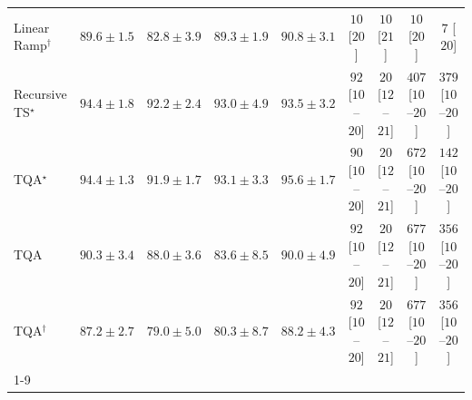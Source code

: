 \begin{tabular}{l|cccc|cccc|}
Linear Ramp$^\dagger$ & {\cellcolor[HTML]{04649D}} \color[HTML]{F1F1F1} $89.6\pm 1.5$ & {\cellcolor[HTML]{2484BA}} \color[HTML]{F1F1F1} $82.8\pm 3.9$ & {\cellcolor[HTML]{05659F}} \color[HTML]{F1F1F1} $89.3\pm 1.9$ & {\cellcolor[HTML]{045F95}} \color[HTML]{F1F1F1} $90.8\pm 3.1$ & {\cellcolor[HTML]{FFF7F3}} \color[HTML]{000000} $10$ [$20$] & {\cellcolor[HTML]{FFF7F3}} \color[HTML]{000000} $10$ [$21$] & {\cellcolor[HTML]{FFF7F3}} \color[HTML]{000000} $10$ [$20$] & {\cellcolor[HTML]{FFF7F3}} \color[HTML]{000000} $7$ [$20$] \\
Recursive TS$^\star$ & {\cellcolor[HTML]{034C78}} \color[HTML]{F1F1F1} $94.4\pm 1.8$ & {\cellcolor[HTML]{045A8D}} \color[HTML]{F1F1F1} $92.2\pm 2.4$ & {\cellcolor[HTML]{045585}} \color[HTML]{F1F1F1} $93.0\pm 4.9$ & {\cellcolor[HTML]{045280}} \color[HTML]{F1F1F1} $93.5\pm 3.2$ & {\cellcolor[HTML]{FDE3E0}} \color[HTML]{000000} $92$ [$10$--$20$] & {\cellcolor[HTML]{FFF4F0}} \color[HTML]{000000} $20$ [$12$--$21$] & {\cellcolor[HTML]{F361A0}} \color[HTML]{F1F1F1} $407$ [$10$--$20$] & {\cellcolor[HTML]{F770A4}} \color[HTML]{F1F1F1} $379$ [$10$--$20$] \\
TQA$^\star$ & {\cellcolor[HTML]{034C78}} \color[HTML]{F1F1F1} $94.4\pm 1.3$ & {\cellcolor[HTML]{045B8E}} \color[HTML]{F1F1F1} $91.9\pm 1.7$ & {\cellcolor[HTML]{045585}} \color[HTML]{F1F1F1} $93.1\pm 3.3$ & {\cellcolor[HTML]{03466E}} \color[HTML]{F1F1F1} $95.6\pm 1.7$ & {\cellcolor[HTML]{FDE4E0}} \color[HTML]{000000} $90$ [$10$--$20$] & {\cellcolor[HTML]{FFF4F0}} \color[HTML]{000000} $20$ [$12$--$21$] & {\cellcolor[HTML]{7F0178}} \color[HTML]{F1F1F1} $672$ [$10$--$20$] & {\cellcolor[HTML]{FDD6D2}} \color[HTML]{000000} $142$ [$10$--$20$] \\
TQA & {\cellcolor[HTML]{046198}} \color[HTML]{F1F1F1} $90.3\pm 3.4$ & {\cellcolor[HTML]{056AA6}} \color[HTML]{F1F1F1} $88.0\pm 3.6$ & {\cellcolor[HTML]{1C7FB8}} \color[HTML]{F1F1F1} $83.6\pm 8.5$ & {\cellcolor[HTML]{04629A}} \color[HTML]{F1F1F1} $90.0\pm 4.9$ & {\cellcolor[HTML]{FDE3E0}} \color[HTML]{000000} $92$ [$10$--$20$] & {\cellcolor[HTML]{FFF4F0}} \color[HTML]{000000} $20$ [$12$--$21$] & {\cellcolor[HTML]{7C0177}} \color[HTML]{F1F1F1} $677$ [$10$--$20$] & {\cellcolor[HTML]{F87EA9}} \color[HTML]{F1F1F1} $356$ [$10$--$20$] \\
TQA$^\dagger$ & {\cellcolor[HTML]{056DAB}} \color[HTML]{F1F1F1} $87.2\pm 2.7$ & {\cellcolor[HTML]{4897C4}} \color[HTML]{F1F1F1} $79.0\pm 5.0$ & {\cellcolor[HTML]{3B92C1}} \color[HTML]{F1F1F1} $80.3\pm 8.7$ & {\cellcolor[HTML]{0569A5}} \color[HTML]{F1F1F1} $88.2\pm 4.3$ & {\cellcolor[HTML]{FDE3E0}} \color[HTML]{000000} $92$ [$10$--$20$] & {\cellcolor[HTML]{FFF4F0}} \color[HTML]{000000} $20$ [$12$--$21$] & {\cellcolor[HTML]{7C0177}} \color[HTML]{F1F1F1} $677$ [$10$--$20$] & {\cellcolor[HTML]{F87EA9}} \color[HTML]{F1F1F1} $356$ [$10$--$20$] \\
\cline{1-9}
\bottomrule
\end{tabular}
